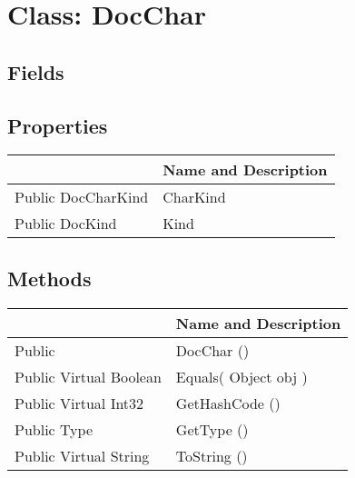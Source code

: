 \documentclass[11pt, oneside, a4paper]{book}
\begin{document}
\hypertarget{SoftwareEngineeringTools.{}Documentation.{}DocChar}{}
\section{Class: DocChar}

\subsection{Fields}

\subsection{Properties}
\begin{center}
\begin{tabular}{| p{3cm} | p{12cm} | }
\hline
\textbf{ } & \textbf{ Name and Description}\\
\hline
 Public  DocCharKind &  CharKind\hypertarget{SoftwareEngineeringTools.{}Documentation.{}DocChar.{}CharKind}{}\\
\hline
 Public  DocKind &  Kind\hypertarget{SoftwareEngineeringTools.{}Documentation.{}DocChar.{}Kind}{}\\
\hline
\end{tabular}
\end{center}

\subsection{Methods}
\begin{center}
\begin{tabular}{| p{3cm} | p{12cm} | }
\hline
\textbf{ } & \textbf{ Name and Description}\\
\hline
 Public  &  DocChar ()\hypertarget{SoftwareEngineeringTools.{}Documentation.{}DocChar.{}DocChar}{}\\
\hline
 Public  Virtual  Boolean &  Equals(\hypertarget{SoftwareEngineeringTools.{}Documentation.{}DocChar.{}Equals\_Object}{} Object  obj  )\\
\hline
 Public  Virtual  Int32 &  GetHashCode ()\hypertarget{SoftwareEngineeringTools.{}Documentation.{}DocChar.{}GetHashCode}{}\\
\hline
 Public  Type &  GetType ()\hypertarget{SoftwareEngineeringTools.{}Documentation.{}DocChar.{}GetType}{}\\
\hline
 Public  Virtual  String &  ToString ()\hypertarget{SoftwareEngineeringTools.{}Documentation.{}DocChar.{}ToString}{}\\
\hline
\end{tabular}
\end{center}
 
\end{document}
